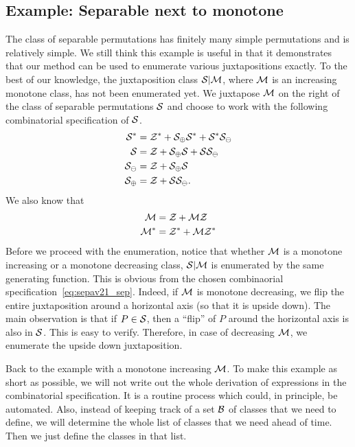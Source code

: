 \documentclass[12pt, a4paper, twoside]{report}
\begin{document}
\subsection{Example: Separable next to monotone}
\label{sec:example_sepav21}
The class of separable permutations has finitely many simple permutations and is relatively simple. We still think this example is useful in that it demonstrates that our method can be used to enumerate various juxtapositions exactly. To the best of our knowledge, the juxtaposition class $\S|\M$, where $\M$ is an increasing monotone class, has not been enumerated yet. We juxtapose $\M$ on the right of the class of separable permutations $\S$ and choose to work with the following combinatorial specification of $\S$.
\begin{align}
  \begin{aligned}
    \S^* &= \Z^* + \S_{\oplus}\S^* + \S^*\S_{\ominus}\\
    \S &= \Z + \S_{\oplus}\S + \S\S_{\ominus}\\
    \S_{\ominus} &= \Z + \S_\oplus\S\\
    \S_\oplus &= \Z + \S\S_\ominus.
    \label{eq:sepav21_sep}
  \end{aligned}
\end{align}
We also know that
\begin{align}
  \begin{aligned}
    \M &= \Z + \M\Z\\
    \Mstar &= \Zstar + \M\Zstar
  \end{aligned}
\end{align}
Before we proceed with the enumeration, notice that whether $\M$ is a monotone increasing or a monotone decreasing class, $\S|\M$ is enumerated by the same generating function. This is obvious from the chosen combinaorial specification~\eqref{eq:sepav21_sep}. Indeed, if $\M$ is monotone decreasing, we flip the entire juxtaposition around a horizontal axis (so that it is upside down). The main observation is that if $P \in \S$, then a ``flip'' of $P$ around the horizontal axis is also in $\S$. This is easy to verify. Therefore, in case of decreasing $\M$, we enumerate the upside down juxtaposition.

Back to the example with a monotone increasing $\M$. To make this example as short as possible, we will not write out the whole derivation of expressions in the combinatorial specification. It is a routine process which could, in principle, be automated. Also, instead of keeping track of a set $\B$ of classes that we need to define, we will determine the whole list of classes that we need ahead of time. Then we just define the classes in that list.
\end{document}
